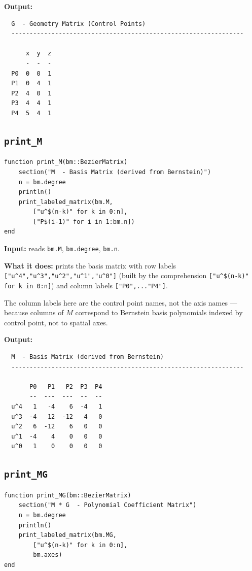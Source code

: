 \documentclass[12pt, a4paper]{article}
\newcommand{\cd}[1]{\texttt{#1}}
\begin{document}
\textbf{Output:}
\begin{verbatim}
  G  - Geometry Matrix (Control Points)
  ----------------------------------------------------------------

      x  y  z
      -  -  -
  P0  0  0  1
  P1  0  4  1
  P2  4  0  1
  P3  4  4  1
  P4  5  4  1
\end{verbatim}

\subsection{\texttt{print\_M}}

\begin{verbatim}
function print_M(bm::BezierMatrix)
    section("M  - Basis Matrix (derived from Bernstein)")
    n = bm.degree
    println()
    print_labeled_matrix(bm.M,
        ["u^$(n-k)" for k in 0:n],
        ["P$(i-1)" for i in 1:bm.n])
end
\end{verbatim}

\textbf{Input:} reads \cd{bm.M}, \cd{bm.degree}, \cd{bm.n}.

\textbf{What it does:} prints the basis matrix with row
labels \cd{["u\^{}4","u\^{}3","u\^{}2","u\^{}1","u\^{}0"]}
(built by the comprehension \cd{["u\^{}\$(n-k)" for k in 0:n]})
and column labels \cd{["P0",..."P4"]}.

The column labels here are the control point names,
not the axis names --- because columns of $M$ correspond
to Bernstein basis polynomials indexed by control point,
not to spatial axes.

\textbf{Output:}
\begin{verbatim}
  M  - Basis Matrix (derived from Bernstein)
  ----------------------------------------------------------------

       P0   P1   P2  P3  P4
       --  ---  ---  --  --
  u^4   1   -4    6  -4   1
  u^3  -4   12  -12   4   0
  u^2   6  -12    6   0   0
  u^1  -4    4    0   0   0
  u^0   1    0    0   0   0
\end{verbatim}

\subsection{\texttt{print\_MG}}

\begin{verbatim}
function print_MG(bm::BezierMatrix)
    section("M * G  - Polynomial Coefficient Matrix")
    n = bm.degree
    println()
    print_labeled_matrix(bm.MG,
        ["u^$(n-k)" for k in 0:n],
        bm.axes)
end
\end{verbatim}
\end{document}
